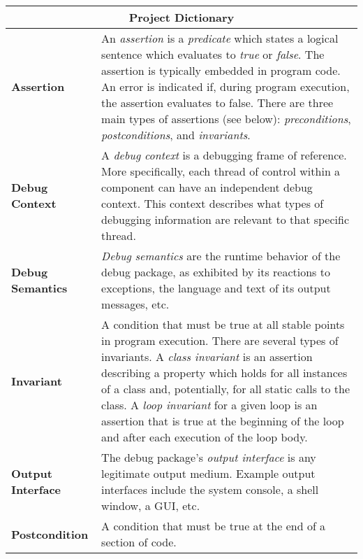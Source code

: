 \documentclass{article}
\begin{document}
\begin{table}[htbp]
  \begin{center}
    \begin{tabular}{|l|p{4in}|}
        \hline
        \multicolumn{2}{|c|}{Project Dictionary}
        \\ \hline\hline

        \textbf{Assertion} & 
        An \emph{assertion} is a \emph{predicate} which states a logical
        sentence which evaluates to \emph{true} or \emph{false}.  The
        assertion is typically embedded in program code. An error is
        indicated if, during program execution, the assertion evaluates
        to false. There are three main types of assertions (see
        below): \emph{preconditions}, \emph{postconditions}, and
        \emph{invariants}. \\ \hline

        \textbf{Debug Context} & 
        A \emph{debug context} is a debugging frame of reference.
        More specifically, each thread of control within a
        component can have an independent debug context.  This
        context describes what types of debugging information are
        relevant to that specific thread. \\ \hline

        \textbf{Debug Semantics} & 
        \emph{Debug semantics} are the runtime behavior of the
        debug package, as exhibited by its reactions to
        exceptions, the language and text of its output
        messages, etc.\\ \hline

        \textbf{Invariant} & 
        A condition that must be true at all stable points in
        program execution. There are several types of invariants.
        A \emph{class invariant} is an assertion describing a
        property which holds for all instances of a class and,
        potentially, for all static calls to the class. A
        \emph{loop invariant} for a given loop is an assertion that
        is true at the beginning of the loop and after each
        execution of the loop body. \\ \hline

        \textbf{Output Interface} & 
        The debug package's \emph{output interface} is any
        legitimate output medium.  Example output interfaces
        include the system console, a shell window, a GUI, etc. \\ \hline

        \textbf{Postcondition} & 
        A condition that must be true at the end of a section
        of code. \\ \hline


\end{tabular}
\end{center}
\end{table}
\end{document}
